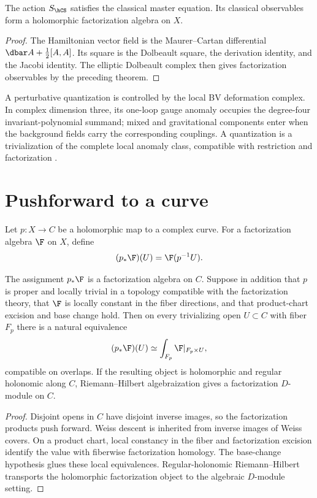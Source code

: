 \begin{theorem}
The action $S_{\hCS}$ satisfies the classical master equation. Its classical observables form a holomorphic factorization algebra on $X$.
\end{theorem}
\begin{proof}
The Hamiltonian vector field is the Maurer--Cartan differential $\dbar A+\frac12[A,A]$. Its square is the Dolbeault square, the derivation identity, and the Jacobi identity. The elliptic Dolbeault complex then gives factorization observables by the preceding theorem.
\end{proof}

A perturbative quantization is controlled by the local BV deformation complex. In complex dimension three, its one-loop gauge anomaly occupies the degree-four invariant-polynomial summand; mixed and gravitational components enter when the background fields carry the corresponding couplings. A quantization is a trivialization of the complete local anomaly class, compatible with restriction and factorization \cite{CostelloLiAnomaly}.

\chapter{Pushforward to a curve}
Let $p:X\to C$ be a holomorphic map to a complex curve. For a factorization algebra $\F$ on $X$, define
\[
 (p_*\F)(U)=\F(p^{-1}U).
\]

\begin{theorem}
The assignment $p_*\F$ is a factorization algebra on $C$. Suppose in addition that $p$ is proper and locally trivial in a topology compatible with the factorization theory, that $\F$ is locally constant in the fiber directions, and that product-chart excision and base change hold. Then on every trivializing open $U\subset C$ with fiber $F_p$ there is a natural equivalence
\[
 (p_*\F)(U)\simeq
 \int_{F_p}\F|_{F_p\times U},
\]
compatible on overlaps. If the resulting object is holomorphic and regular holonomic along $C$, Riemann--Hilbert algebraization gives a factorization $D$-module on $C$.
\end{theorem}
\begin{proof}
Disjoint opens in $C$ have disjoint inverse images, so the factorization products push forward. Weiss descent is inherited from inverse images of Weiss covers. On a product chart, local constancy in the fiber and factorization excision identify the value with fiberwise factorization homology. The base-change hypothesis glues these local equivalences. Regular-holonomic Riemann--Hilbert transports the holomorphic factorization object to the algebraic $D$-module setting.
\end{proof}

